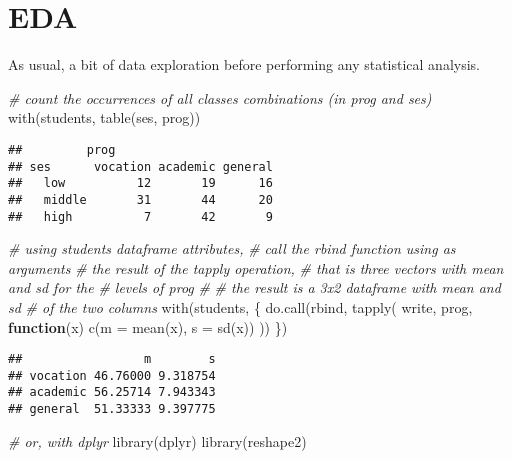 \documentclass[
  oneside]{book}
\newenvironment{Shaded}{\begin{snugshade}}{\end{snugshade}}
\newcommand{\AttributeTok}[1]{\textcolor[rgb]{0.77,0.63,0.00}{#1}}
\newcommand{\CommentTok}[1]{\textcolor[rgb]{0.56,0.35,0.01}{\textit{#1}}}
\newcommand{\ControlFlowTok}[1]{\textcolor[rgb]{0.13,0.29,0.53}{\textbf{#1}}}
\newcommand{\FunctionTok}[1]{\textcolor[rgb]{0.00,0.00,0.00}{#1}}
\newcommand{\NormalTok}[1]{#1}
\begin{document}
\hypertarget{eda}{%
\section{EDA}\label{eda}}

As usual, a bit of data exploration before performing any statistical
analysis.

\begin{Shaded}
\begin{Highlighting}[]
\CommentTok{\# count the occurrences of all classes combinations (in prog and ses)}
\FunctionTok{with}\NormalTok{(students, }\FunctionTok{table}\NormalTok{(ses, prog))}
\end{Highlighting}
\end{Shaded}

\begin{verbatim}
##         prog
## ses      vocation academic general
##   low          12       19      16
##   middle       31       44      20
##   high          7       42       9
\end{verbatim}

\begin{Shaded}
\begin{Highlighting}[]
\CommentTok{\# using students dataframe attributes,}
\CommentTok{\# call the rbind function using as arguments}
\CommentTok{\# the result of the tapply operation,}
\CommentTok{\# that is three vectors with mean and sd for the}
\CommentTok{\# levels of \textasciigrave{}prog\textasciigrave{}}
\CommentTok{\#}
\CommentTok{\# the result is a 3x2 dataframe with mean and sd}
\CommentTok{\# of the two columns}
\FunctionTok{with}\NormalTok{(students, \{}
  \FunctionTok{do.call}\NormalTok{(rbind, }\FunctionTok{tapply}\NormalTok{(}
\NormalTok{    write, prog,}
    \ControlFlowTok{function}\NormalTok{(x) }\FunctionTok{c}\NormalTok{(}\AttributeTok{m =} \FunctionTok{mean}\NormalTok{(x), }\AttributeTok{s =} \FunctionTok{sd}\NormalTok{(x))}
\NormalTok{  ))}
\NormalTok{\})}
\end{Highlighting}
\end{Shaded}

\begin{verbatim}
##                 m        s
## vocation 46.76000 9.318754
## academic 56.25714 7.943343
## general  51.33333 9.397775
\end{verbatim}

\begin{Shaded}
\begin{Highlighting}[]
\CommentTok{\# or, with dplyr}
\FunctionTok{library}\NormalTok{(dplyr)}
\FunctionTok{library}\NormalTok{(reshape2)}
\end{Highlighting}
\end{Shaded}
\end{document}

